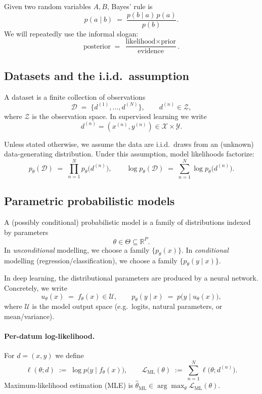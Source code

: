 Given two random variables $A,B$, Bayes' rule is
\begin{equation}
  p(a\mid b) \;=\; \frac{p(b\mid a)\,p(a)}{p(b)}.
\end{equation}
We will repeatedly use the informal slogan:
\[
\text{posterior} \;=\; \frac{\text{likelihood}\times\text{prior}}{\text{evidence}}.
\]

\subsection{Datasets and the i.i.d.\ assumption}
A dataset is a finite collection of observations
\begin{equation}
  \mathcal{D} \;=\; \{d^{(1)},\dots,d^{(N)}\},
  \qquad
  d^{(n)} \in \mathcal{Z},
\end{equation}
where $\mathcal{Z}$ is the observation space. In supervised learning we write
\[
d^{(n)}=(x^{(n)},y^{(n)})\in \mathcal{X}\times\mathcal{Y}.
\]

Unless stated otherwise, we assume the data are i.i.d.\ draws from an (unknown) data-generating distribution.
Under this assumption, model likelihoods factorize:
\begin{equation}
  p_\theta(\mathcal{D})
  \;=\;
  \prod_{n=1}^N p_\theta\!\bigl(d^{(n)}\bigr),
  \qquad
  \log p_\theta(\mathcal{D})
  \;=\;
  \sum_{n=1}^N \log p_\theta\!\bigl(d^{(n)}\bigr).
\end{equation}

\subsection{Parametric probabilistic models}
A (possibly conditional) probabilistic model is a family of distributions indexed by parameters
\[
\theta \in \Theta \subseteq \mathbb{R}^P.
\]
In \emph{unconditional} modelling, we choose a family $\{p_\theta(x)\}$.
In \emph{conditional} modelling (regression/classification), we choose a family $\{p_\theta(y\mid x)\}$.

In deep learning, the distributional parameters are produced by a neural network. Concretely, we write
\begin{equation}
  u_\theta(x) \;=\; f_\theta(x) \in \mathcal{U},
  \qquad
  p_\theta(y\mid x) \;=\; p\bigl(y \mid u_\theta(x)\bigr),
\end{equation}
where $\mathcal{U}$ is the model output space (e.g.\ logits, natural parameters, or mean/variance).

\paragraph{Per-datum log-likelihood.}
For $d=(x,y)$ we define
\begin{equation}
  \ell(\theta; d)
  \;:=\;
  \log p\bigl(y \mid f_\theta(x)\bigr),
  \qquad
  \mathcal{L}_{\mathrm{ML}}(\theta)
  \;:=\;
  \sum_{n=1}^N \ell\!\bigl(\theta; d^{(n)}\bigr).
\end{equation}
Maximum-likelihood estimation (MLE) is $\hat\theta_{\mathrm{ML}}\in\arg\max_\theta \mathcal{L}_{\mathrm{ML}}(\theta)$.

